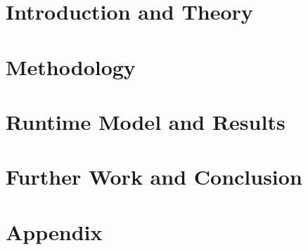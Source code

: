 
\addtolength{\evensidemargin}{-12mm}

%
%
\part[Introduction and Theory]{Introduction and Theory}
\label{part:introAndTheory}

 

\part[Methodology]{Methodology}
\label{part:methods}



\part[Runtime Model and Results]{Runtime Model and Results}
\label{part:modelResults}

%


\part[Further Work and Conclusion]{Further Work and Conclusion}
\label{part:resultsAndConclusion}




%
%

\part*{Appendix}
\appendix %



